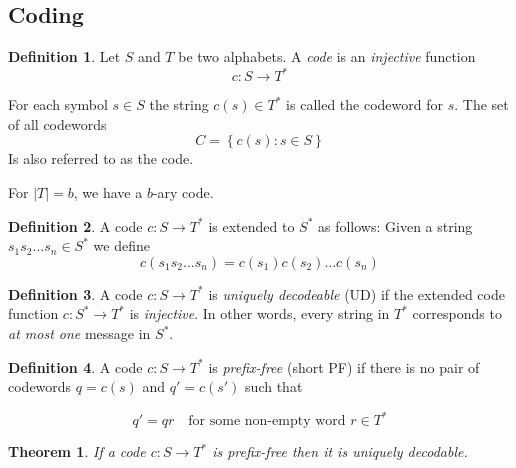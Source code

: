 \documentclass[a4paper]{article}
\newtheorem{theorem}{Theorem}
\theoremstyle{definition} \newtheorem*{definition}{Definition}
\begin{document}
\subsection{Coding}
\begin{definition}
  Let $S$ and $T$ be two alphabets. A \emph{code} is an \emph{injective}
  function 
  \[
    c : S \rightarrow T^*
  \]

  For each symbol $s \in S$ the string $c(s) \in T^*$ is called the 
  codeword for $s$. The set of all codewords
  \[
    C = \left\{ c(s) : s \in S \right\}
  \]
  Is also referred to as the code.
\end{definition}

\begin{remark}
  For $|T|=b$, we have a $b$-ary code.
\end{remark}

\begin{definition}
  A code $c : S \rightarrow T^*$ is extended to  $S^*$ as follows: Given
  a string $s_1s_2 \dots s_n \in S^*$ we define
  \[
    c(s_1s_2 \dots s_n) = c(s_1)c(s_2)\dots c(s_n)
  \]
\end{definition}

\begin{definition}
  A code $c : S \rightarrow T^*$ is \emph{uniquely decodeable} (UD) if the
  extended code function $c : S^{*} \rightarrow T^*$ is \emph{injective}.
  In other words, every string in $T^*$ corresponds to \emph{at most one} 
  message in $S^*$.
\end{definition}

\begin{definition}
  A code $c : S \rightarrow T^*$ is \emph{prefix-free} (short PF) if there
  is no pair of codewords $q = c(s)$ and $q' = c(s')$ such that

  \[
    q' = qr  \quad \text{for some non-empty word } r \in T^*
  \]

\end{definition}

\begin{theorem}
    If a code $c : S \rightarrow T^*$ is prefix-free then it is uniquely decodable.
    \label{thm:pfimpliesud}
\end{theorem}
\end{document}
